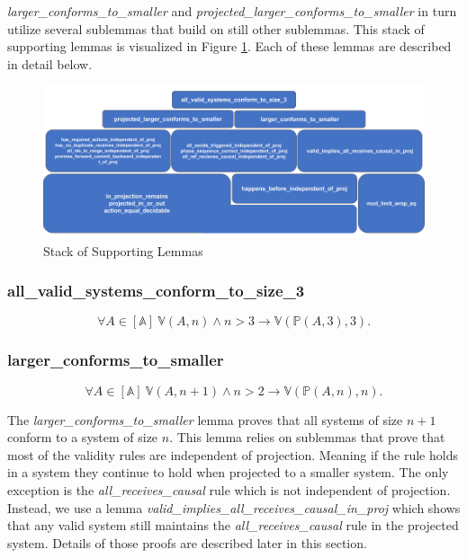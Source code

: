\documentclass[runningheads]{llncs}
\newcommand{\action}{\mathds{A}}
\newcommand{\listaction}{[\action]}
\newcommand{\actsvalid}[2]{\mathds{V}(#1, #2)}
\newcommand{\projectsize}[2]{\mathds{P}(#1, #2)}
\begin{document}
\emph{larger\_conforms\_to\_smaller} and \emph{projected\_larger\_conforms\_to\_smaller} in turn utilize several sublemmas that build on still other sublemmas. This stack of supporting lemmas is visualized in Figure \ref{fig:coqLemmaStack}. Each of these lemmas are described in detail below.

\begin{figure}[h]
    \centering
    \includegraphics[scale=0.5]{CoqLemmaStack.png}
    \caption{Stack of Supporting Lemmas}
    \label{fig:coqLemmaStack}
\end{figure}

\subsubsection{all\_valid\_systems\_conform\_to\_size\_3}
$$\forall A \in \listaction\ \actsvalid{A}{n} \wedge n > 3 \longrightarrow \actsvalid{\projectsize{A}{3}}{3}.$$

\subsubsection{larger\_conforms\_to\_smaller}
$$\forall A \in \listaction\ \actsvalid{A}{n+1} \wedge n > 2 \longrightarrow \actsvalid{\projectsize{A}{n}}{n}.$$

The \emph{larger\_conforms\_to\_smaller} lemma proves that all systems of size $n+1$ conform to a system of size $n$. This lemma relies on sublemmas that prove that most of the validity rules are independent of projection. Meaning if the rule holds in a system they continue to hold when projected to a smaller system. The only exception is the \emph{all\_receives\_causal} rule which is not independent of projection. Instead, we use a lemma \emph{valid\_implies\_all\_receives\_causal\_in\_proj} which shows that any valid system still maintains the \emph{all\_receives\_causal} rule in the projected system. Details of those proofs are described later in this section. 
\end{document}
